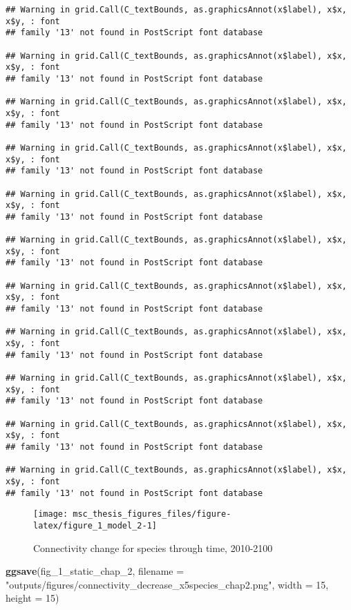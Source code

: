 \documentclass[
]{article}
\newenvironment{Shaded}{\begin{snugshade}}{\end{snugshade}}
\newcommand{\DataTypeTok}[1]{\textcolor[rgb]{0.13,0.29,0.53}{#1}}
\newcommand{\DecValTok}[1]{\textcolor[rgb]{0.00,0.00,0.81}{#1}}
\newcommand{\KeywordTok}[1]{\textcolor[rgb]{0.13,0.29,0.53}{\textbf{#1}}}
\newcommand{\NormalTok}[1]{#1}
\newcommand{\StringTok}[1]{\textcolor[rgb]{0.31,0.60,0.02}{#1}}
\begin{document}
\begin{verbatim}
## Warning in grid.Call(C_textBounds, as.graphicsAnnot(x$label), x$x, x$y, : font
## family '13' not found in PostScript font database

## Warning in grid.Call(C_textBounds, as.graphicsAnnot(x$label), x$x, x$y, : font
## family '13' not found in PostScript font database

## Warning in grid.Call(C_textBounds, as.graphicsAnnot(x$label), x$x, x$y, : font
## family '13' not found in PostScript font database

## Warning in grid.Call(C_textBounds, as.graphicsAnnot(x$label), x$x, x$y, : font
## family '13' not found in PostScript font database

## Warning in grid.Call(C_textBounds, as.graphicsAnnot(x$label), x$x, x$y, : font
## family '13' not found in PostScript font database

## Warning in grid.Call(C_textBounds, as.graphicsAnnot(x$label), x$x, x$y, : font
## family '13' not found in PostScript font database

## Warning in grid.Call(C_textBounds, as.graphicsAnnot(x$label), x$x, x$y, : font
## family '13' not found in PostScript font database

## Warning in grid.Call(C_textBounds, as.graphicsAnnot(x$label), x$x, x$y, : font
## family '13' not found in PostScript font database

## Warning in grid.Call(C_textBounds, as.graphicsAnnot(x$label), x$x, x$y, : font
## family '13' not found in PostScript font database

## Warning in grid.Call(C_textBounds, as.graphicsAnnot(x$label), x$x, x$y, : font
## family '13' not found in PostScript font database

## Warning in grid.Call(C_textBounds, as.graphicsAnnot(x$label), x$x, x$y, : font
## family '13' not found in PostScript font database
\end{verbatim}

\begin{figure}
\texttt{[image: msc\_thesis\_figures\_files/figure-latex/figure\_1\_model\_2-1]} \caption{Connectivity change for species through time, 2010-2100}\label{fig:figure_1_model_2}
\end{figure}

\begin{Shaded}
\begin{Highlighting}[]
\KeywordTok{ggsave}\NormalTok{(fig_}\DecValTok{1}\NormalTok{_static_chap_}\DecValTok{2}\NormalTok{, }
       \DataTypeTok{filename =} \StringTok{"outputs/figures/connectivity_decrease_x5species_chap2.png"}\NormalTok{, }
       \DataTypeTok{width =} \DecValTok{15}\NormalTok{, }\DataTypeTok{height =} \DecValTok{15}\NormalTok{)}
\end{Highlighting}
\end{Shaded}
\end{document}
